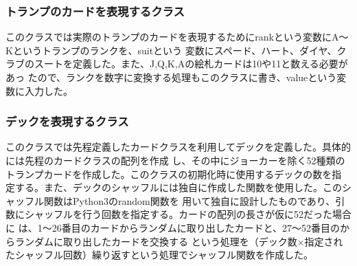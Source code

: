 \subsubsection{トランプのカードを表現するクラス}
このクラスでは実際のトランプのカードを表現するためにrankという変数にA～Kというトランプのランクを、suitという
変数にスペード、ハート、ダイヤ、クラブのスートを定義した。また、J,Q,K,Aの絵札カードは10や11と数える必要があっ
たので、ランクを数字に変換する処理もこのクラスに書き、valueという変数に入力した。%

\subsubsection{デックを表現するクラス}
このクラスでは先程定義したカードクラスを利用してデックを定義した。具体的には先程のカードクラスの配列を作成
し、その中にジョーカーを除く52種類のトランプカードを作成した。このクラスの初期化時に使用するデックの数を指
定する。また、デックのシャッフルには独自に作成した関数を使用した。このシャッフル関数はPython3のrandom関数を
用いて独自に設計したものであり、引数にシャッフルを行う回数を指定する。カードの配列の長さが仮に52だった場合に
は、1～26番目のカードからランダムに取り出したカードと、27～52番目のからランダムに取り出したカードを交換する
という処理を（デック数×指定されたシャッフル回数）繰り返すという処理でシャッフル関数を作成した。%

